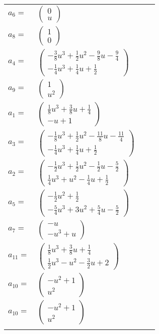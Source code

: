 \documentclass[1p]{elsarticle_modified}
\theoremstyle{definition}
\begin{document}
\begin{tabular}{m{7pt} m{180pt} m{7pt} m{180pt} }
\flushright $a_{6}=$&$\begin{pmatrix}0\\u\end{pmatrix}$ \\
\flushright $a_{8}=$&$\begin{pmatrix}1\\0\end{pmatrix}$ \\
\flushright $a_{4}=$&$\begin{pmatrix}-\frac{3}{8} u^3+\frac{1}{2} u^2-\frac{9}{8} u-\frac{9}{4}\\-\frac{1}{4} u^3+\frac{1}{4} u+\frac{1}{2}\end{pmatrix}$ \\
\flushright $a_{9}=$&$\begin{pmatrix}1\\u^2\end{pmatrix}$ \\
\flushright $a_{1}=$&$\begin{pmatrix}\frac{1}{8} u^3+\frac{3}{8} u+\frac{1}{4}\\- u+1\end{pmatrix}$ \\
\flushright $a_{3}=$&$\begin{pmatrix}-\frac{1}{8} u^3+\frac{1}{2} u^2-\frac{11}{8} u-\frac{11}{4}\\-\frac{1}{4} u^3+\frac{1}{4} u+\frac{1}{2}\end{pmatrix}$ \\
\flushright $a_{2}=$&$\begin{pmatrix}-\frac{1}{2} u^3+\frac{1}{2} u^2-\frac{1}{2} u-\frac{5}{2}\\\frac{1}{4} u^3+u^2-\frac{1}{4} u+\frac{1}{2}\end{pmatrix}$ \\
\flushright $a_{5}=$&$\begin{pmatrix}-\frac{1}{2} u^2+\frac{1}{2}\\-\frac{5}{4} u^3+3 u^2+\frac{5}{4} u-\frac{5}{2}\end{pmatrix}$ \\
\flushright $a_{7}=$&$\begin{pmatrix}- u\\- u^3+u\end{pmatrix}$ \\
\flushright $a_{11}=$&$\begin{pmatrix}\frac{1}{8} u^3+\frac{3}{8} u+\frac{1}{4}\\\frac{1}{2} u^3- u^2-\frac{3}{2} u+2\end{pmatrix}$ \\
\flushright $a_{10}=$&$\begin{pmatrix}- u^2+1\\u^2\end{pmatrix}$\\ \flushright $a_{10}=$&$\begin{pmatrix}- u^2+1\\u^2\end{pmatrix}$\\&\end{tabular}
\end{document}
